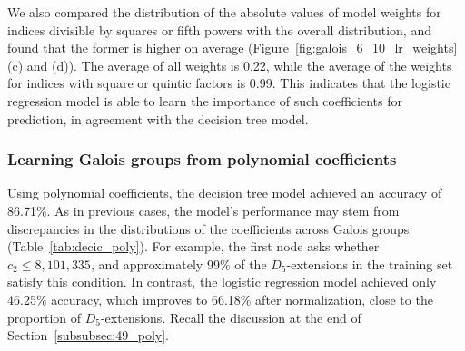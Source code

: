 \documentclass[letterpaper, 10pt]{article}
\newcommand{\1}{\mathds{1}}	%
\theoremstyle{definition}
\theoremstyle{remark}
\begin{document}
We also compared the distribution of the absolute values of model weights for indices divisible by squares or fifth powers with the overall distribution, and found that the former is higher on average (Figure~\ref{fig:galois_6_10_lr_weights} (c) and (d)).  
The average of all weights is  0.22, while the average of the weights for indices with square or quintic factors is  0.99.
This indicates that the logistic regression model is able to learn the importance of such coefficients for prediction, in agreement with the decision tree model.


\subsubsection{Learning Galois groups from polynomial coefficients}

Using polynomial coefficients, the decision tree model achieved an accuracy of 86.71\%.  
As in previous cases, the model's performance may stem from discrepancies in the distributions of the coefficients across Galois groups (Table~\ref{tab:decic_poly}).  
For example, the first node asks whether \( c_2 \le 8{,}101{,}335 \), and approximately 99\% of the \( D_5 \)-extensions in the training set satisfy this condition.  
In contrast, the logistic regression model achieved only 46.25\% accuracy, which improves to 66.18\% after normalization, close to the proportion of \(D_5\)-extensions. Recall the discussion at the end of Section~\ref{subsubsec:49_poly}.
\end{document}
